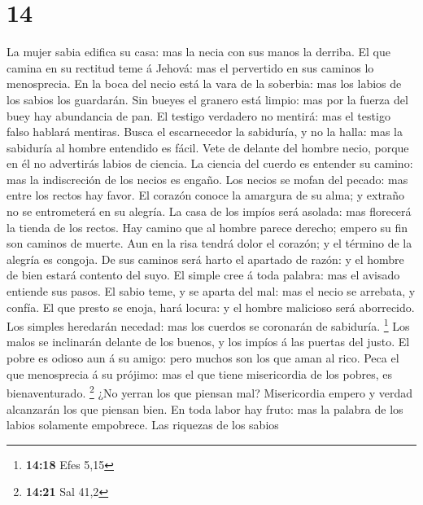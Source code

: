 \hypertarget{section-13}{%
\section{14}\label{section-13}}

 La mujer sabia edifica su casa: mas la necia con sus
manos la derriba.  El que camina en su rectitud teme á
Jehová: mas el pervertido en sus caminos lo menosprecia. 
En la boca del necio está la vara de la soberbia: mas los labios de los
sabios los guardarán.  Sin bueyes el granero está limpio:
mas por la fuerza del buey hay abundancia de pan.  El
testigo verdadero no mentirá: mas el testigo falso hablará mentiras.
 Busca el escarnecedor la sabiduría, y no la halla: mas la
sabiduría al hombre entendido es fácil.  Vete de delante
del hombre necio, porque en él no advertirás labios de ciencia.
 La ciencia del cuerdo es entender su camino: mas la
indiscreción de los necios es engaño.  Los necios se mofan
del pecado: mas entre los rectos hay favor.  El corazón
conoce la amargura de su alma; y extraño no se entrometerá en su
alegría.  La casa de los impíos será asolada: mas
florecerá la tienda de los rectos.  Hay camino que al
hombre parece derecho; empero su fin son caminos de muerte.
 Aun en la risa tendrá dolor el corazón; y el término de
la alegría es congoja.  De sus caminos será harto el
apartado de razón: y el hombre de bien estará contento del suyo.
 El simple cree á toda palabra: mas el avisado entiende
sus pasos.  El sabio teme, y se aparta del mal: mas el
necio se arrebata, y confía.  El que presto se enoja,
hará locura: y el hombre malicioso será aborrecido.  Los
simples heredarán necedad: mas los cuerdos se coronarán de sabiduría.
\footnote{\textbf{14:18} Efes 5,15}  Los malos se
inclinarán delante de los buenos, y los impíos á las puertas del justo.
 El pobre es odioso aun á su amigo: pero muchos son los
que aman al rico.  Peca el que menosprecia á su prójimo:
mas el que tiene misericordia de los pobres, es bienaventurado.
\footnote{\textbf{14:21} Sal 41,2}  ¿No yerran los que
piensan mal? Misericordia empero y verdad alcanzarán los que piensan
bien.  En toda labor hay fruto: mas la palabra de los
labios solamente empobrece.  Las riquezas de los sabios
